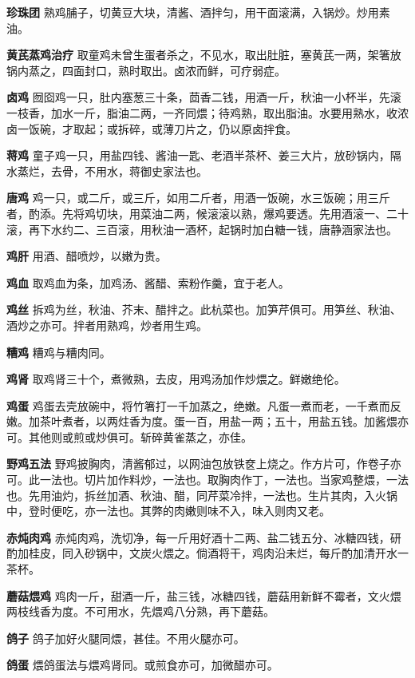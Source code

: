 \documentclass[]{article}
\begin{document}
\textbf{珍珠团}
熟鸡脯子，切黄豆大块，清酱、酒拌匀，用干面滚满，入锅炒。炒用素油。

\textbf{黄芪蒸鸡治疗}
取童鸡未曾生蛋者杀之，不见水，取出肚脏，塞黄芪一两，架箸放锅内蒸之，四面封口，熟时取出。卤浓而鲜，可疗弱症。

\textbf{卤鸡}
囫囵鸡一只，肚内塞葱三十条，茴香二钱，用酒一斤，秋油一小杯半，先滚一枝香，加水一斤，脂油二两，一齐同煨；待鸡熟，取出脂油。水要用熟水，收浓卤一饭碗，才取起；或拆碎，或薄刀片之，仍以原卤拌食。

\textbf{蒋鸡}
童子鸡一只，用盐四钱、酱油一匙、老酒半茶杯、姜三大片，放砂锅内，隔水蒸烂，去骨，不用水，蒋御史家法也。

\textbf{唐鸡}
鸡一只，或二斤，或三斤，如用二斤者，用酒一饭碗，水三饭碗；用三斤者，酌添。先将鸡切块，用菜油二两，候滚滚以熟，爆鸡要透。先用酒滚一、二十滚，再下水约二、三百滚，用秋油一酒杯，起锅时加白糖一钱，唐静涵家法也。

\textbf{鸡肝} 用酒、醋喷炒，以嫩为贵。

\textbf{鸡血} 取鸡血为条，加鸡汤、酱醋、索粉作羹，宜于老人。

\textbf{鸡丝}
拆鸡为丝，秋油、芥末、醋拌之。此杭菜也。加笋芹俱可。用笋丝、秋油、酒炒之亦可。拌者用熟鸡，炒者用生鸡。

\textbf{糟鸡} 糟鸡与糟肉同。

\textbf{鸡肾} 取鸡肾三十个，煮微熟，去皮，用鸡汤加作炒煨之。鲜嫩绝伦。

\textbf{鸡蛋}
鸡蛋去壳放碗中，将竹箸打一千加蒸之，绝嫩。凡蛋一煮而老，一千煮而反嫩。加茶叶煮者，以两炷香为度。蛋一百，用盐一两；五十，用盐五钱。加酱煨亦可。其他则或煎或炒俱可。斩碎黄雀蒸之，亦佳。

\textbf{野鸡五法}
野鸡披胸肉，清酱郁过，以网油包放铁奁上烧之。作方片可，作卷子亦可。此一法也。切片加作料炒，一法也。取胸肉作丁，一法也。当家鸡整煨，一法也。先用油灼，拆丝加酒、秋油、醋，同芹菜冷拌，一法也。生片其肉，入火锅中，登时便吃，亦一法也。其弊的肉嫩则味不入，味入则肉又老。

\textbf{赤炖肉鸡}
赤炖肉鸡，洗切净，每一斤用好酒十二两、盐二钱五分、冰糖四钱，研酌加桂皮，同入砂锅中，文炭火煨之。倘酒将干，鸡肉沿未烂，每斤酌加清开水一茶杯。

\textbf{蘑菇煨鸡}
鸡肉一斤，甜酒一斤，盐三钱，冰糖四钱，蘑菇用新鲜不霉者，文火煨两枝线香为度。不可用水，先煨鸡八分熟，再下蘑菇。

\textbf{鸽子} 鸽子加好火腿同煨，甚佳。不用火腿亦可。

\textbf{鸽蛋} 煨鸽蛋法与煨鸡肾同。或煎食亦可，加微醋亦可。
\end{document}

